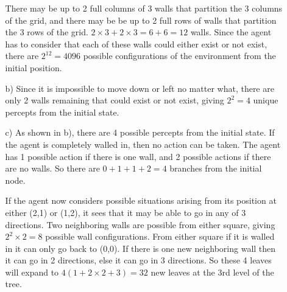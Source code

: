 \documentclass{article}
\begin{document}
\begin{enumerate}
\begin{enumerate}
There may be up to 2 full columns of 3 walls that partition 
the 3 columns of the grid, and there may be
be up to 2 full rows of walls that partition the 3 rows of the grid. $2
\times 3 + 2 \times 3 = 6 + 6 = 12$ walls. Since the agent has to consider that
each of these walls could either exist or not exist, there are $2^{12} = 4096$
possible configurations of the environment from the initial position.

\item[b)]
Since it is impossible to move down or left no matter what, there are
only 2 walls remaining that could exist or not exist, giving $2^2 = 4$ unique
percepts from the initial state.

\item[c)]
As shown in b), there are 4 possible percepts from the initial state. If the
agent is completely walled in, then no action can be taken. The agent has 1
possible action if there is one wall, and 2 possible actions if there are
no walls. So there are $0 + 1 + 1 + 2 = 4$ branches from the initial node.

If the agent now considers possible situations arising from its position at
either (2,1) or (1,2), it sees that it may be able to go in any of 3
directions. Two neighboring walls are possible from either square, giving
$2^2 \times 2 = 8$ possible wall configurations. From either square if it is
walled in it can only go back to (0,0). If there is one new neighboring wall
then it can go in 2 directions, else it can go in 3 directions. So these
4 leaves will expand to $4(1 + 2 \times 2 + 3) = 32$ new leaves at the 3rd
level of the tree.


\end{enumerate}

\end{enumerate}
\end{document}
